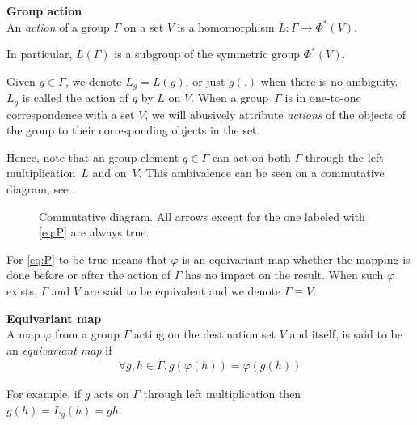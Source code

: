\begin{definition}\textbf{Group action}\\
An \emph{action} of a group $\Gamma$ on a set $V$ is a homomorphism $L: \Gamma \to \Phi^*(V)$.
\end{definition}

In particular, $L(\Gamma)$ is a subgroup of the symmetric group $\Phi^*(V)$.

\begin{remark}
Given $g \in \Gamma$, we denote $L_g = L(g)$, or just $g(.)$ when there is no ambiguity. $L_g$ is called the action of $g$ by $L$ on $V$. When a group~$\Gamma$ is in one-to-one correspondence with a set $V$, we will abusively attribute \emph{actions} of the objects of the group to their corresponding objects in the set.
\end{remark}

Hence, note that an group element $g \in \Gamma$ can act on both $\Gamma$ through the left multiplication~$L$ and on~$V$. This ambivalence can be seen on a commutative diagram, see .%

\begin{figure}[H]
\centering
{}
\caption{Commutative diagram. All arrows except for the one labeled with \eqref{eq:P} are always true.}
\label{fig:com}
\end{figure}

For \eqref{eq:P} to be true means that $\varphi$ is an equivariant map \ie whether the mapping is done before or after the action of $\Gamma$ has no impact on the result. When such $\varphi$ exists, $\Gamma$ and $V$ are said to be equivalent and we denote $\Gamma \equiv V$.

\begin{definition}\textbf{Equivariant map}\\
A map $\varphi$ from a group $\Gamma$ acting on the destination set $V$ and itself, is said to be an \emph{equivariant map} if
\begin{gather*}
\forall g, h \in \Gamma, g(\varphi(h)) = \varphi(g(h))
\end{gather*}
\label{def:eqmap}
\end{definition}
\begin{remark} For example, if $g$ acts on $\Gamma$ through left multiplication then $g(h) = L_g(h) = gh$.
\end{remark}

